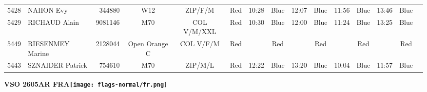 \documentclass{report}
\begin{document}
\begin{longtable}{|c|l|r|c|c|*{5}{cc|}}
    5428 & NAHON Evy & 344880 & W12 & ZIP/F/M & Red & 10:28 & Blue & 12:07 & Blue & 11:56 & Blue & 13:46 & Blue &  \\
    5429 & RICHAUD Alain & 9081146 & M70 & COL V/M/XXL & Red & 10:30 & Blue & 12:00 & Blue & 11:24 & Blue & 13:25 & Blue &  \\
    5449 & RIESENMEY Marine & 2128044 & Open Orange C & COL V/F/M & Red &   & Red &   & Red &   & Red &   & Red &  \\
    5443 & SZNAIDER Patrick & 754610 & M70 & ZIP/M/L & Red & 12:22 & Blue & 13:20 & Blue & 10:04 & Blue & 11:57 & Blue &  \\
  \end{longtable}
\newpage
  \Huge \centering \bfseries VSO 2605AR FRA\normalfont \footnotesize \sffamily \hfill \texttt{[image: flags-normal/fr.png]} \newline 
\end{document}
